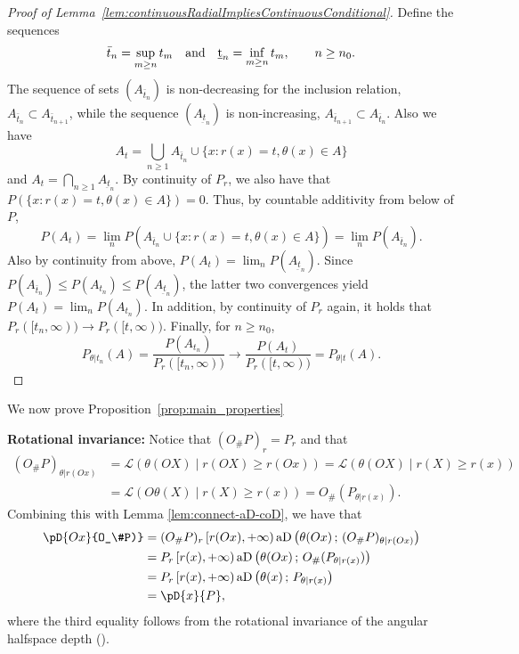 \documentclass{article}
\numberwithin{equation}{section}
\newcommand{\coD}[2]{\pD{#1}{#2}}
\newcommand{\aD}[2]{{\mathrm{aD}}\left({#1}\,;\,{#2}\right)}
\begin{document}
\begin{proof}[Proof of Lemma~\ref{lem:continuousRadialImpliesContinuousConditional}]
Define the sequences
\begin{equation*}
    \bar{t}_n = \sup_{m\geq n}
    t_m\quad\textnormal{and}\quad\underbar{t}_n=\inf_{m\geq n} t_m,\qquad n\ge n_0.
\end{equation*}
The sequence of sets $(A_{\bar{t}_n})$ is non-decreasing for the inclusion relation, $A_{\bar{t}_n}\subset A_{\bar{t}_{n+1}}$, while the sequence $(A_{\underbar{t}_n})$ is non-increasing, $A_{\bar{t}_{n+1}}\subset A_{\bar{t}_{n}}$. Also we have 
$$A_t = \bigcup_{n\ge 1} A_{\bar{t}_n} \cup\{x : r(x) = t, \theta(x)\in A \}$$ and 
 $A_t = \bigcap_{n\ge 1} A_{\underbar{t}_n}$.
By continuity of $P_r$, we also have that $P(\{x : r(x) = t, \theta(x)\in A \}) = 0$. Thus, by countable additivity from below of $P$,
$$P(A_t) = \lim_n P(A_{\bar{t}_n} \cup\{x : r(x) = t, \theta(x)\in A \} ) = \lim_n P(A_{\bar{t}_n}). $$
Also by continuity from above,
$P(A_t) = \lim_n P(A_{\underbar{t}_n})$.  Since
$ P(A_{\bar{t}_n}) \le P(A_{t_n}) \le P(A_{\underbar{t}_n})$, the latter
two convergences yield $P(A_t) = \lim_n P(A_{t_n})$. In addition, by
continuity of $P_r$ again, it holds that $P_r([t_n,\infty))\to P_r ([t,\infty))$. Finally, for $n\ge n_0$,
$$
P_{\theta|t_n}(A) = \frac{P(A_{t_n})}{P_{r}([t_n,\infty))} \to \frac{P(A_{t})}{P_{r}([t,\infty))}
= P_{\theta|t}(A).
$$
  
\end{proof}

We now prove Proposition~\ref{prop:main_properties}


    \noindent\textbf{Rotational invariance:} Notice that
    \( (O_\#P)_r=P_r\) and that
    \begin{align*}
        (O_\#P)_{\theta | r(Ox)} & = \mathcal{L}(\theta(OX) \; |\;
        r(OX)\ge r(Ox)) = \mathcal{L}(\theta(OX) \; |\;  r(X)\ge r(x)) \\
        & =\mathcal{L}(O\theta(X) \; |\;  r(X)\ge r(x)) = O_\#(P_{\theta|r(x)}).
    \end{align*}
    Combining this with Lemma \ref{lem:connect-aD-coD}, we have that
    \begin{align*}
        \coD{Ox}{O_\#P)} & = (O_\#P)_r\left[ r(Ox),+\infty \right)
        \aD{\theta(Ox)}{(O_\#P)_{\theta | r(Ox)}} \\
        & = P_r\left[ r(x),+\infty \right)
        \aD{\theta(Ox)}{O_\#(P_{\theta|r(x)})}       \\
        & = P_r\left[ r(x),+\infty \right)
        \aD{\theta(x)}{P_{\theta|r(x)}}         \\
        & = \coD{x}{P},
    \end{align*}
    where the third equality follows from the rotational invariance
    of the angular halfspace depth (\cite[Theorem 2]{nagy2024theoretical}).
\medskip
\end{document}
